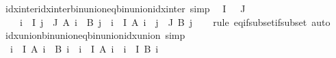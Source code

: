 \begin{isabellebody}
\endisatagproof
{\isafoldproof}%
%
\isadelimproof
\isanewline
%
\endisadelimproof
\isanewline
{}\isamarkupfalse%
\ idx{\isacharunderscore}{\kern0pt}inter{\isacharunderscore}{\kern0pt}idx{\isacharunderscore}{\kern0pt}inter{\isacharunderscore}{\kern0pt}bin{\isacharunderscore}{\kern0pt}union{\isacharunderscore}{\kern0pt}eq{\isacharunderscore}{\kern0pt}bin{\isacharunderscore}{\kern0pt}union{\isacharunderscore}{\kern0pt}idx{\isacharunderscore}{\kern0pt}inter\ {\isacharbrackleft}{\kern0pt}simp{\isacharbrackright}{\kern0pt}{\isacharcolon}{\kern0pt}\isanewline
\ \ {\isachardoublequoteopen}{\isasymlbrakk}I\ {\isasymnoteq}\ {\isacharbraceleft}{\kern0pt}{\isacharbraceright}{\kern0pt}{\isacharsemicolon}{\kern0pt}\ J\ {\isasymnoteq}\ {\isacharbraceleft}{\kern0pt}{\isacharbraceright}{\kern0pt}{\isasymrbrakk}\ {\isasymLongrightarrow}\isanewline
\ \ \ \ {\isacharparenleft}{\kern0pt}{\isasymInter}i\ {\isasymin}\ I{\isachardot}{\kern0pt}\ {\isasymInter}j\ {\isasymin}\ J{\isachardot}{\kern0pt}\ A\ i\ {\isasymunion}\ B\ j{\isacharparenright}{\kern0pt}\ {\isacharequal}{\kern0pt}\ {\isacharparenleft}{\kern0pt}{\isasymInter}i\ {\isasymin}\ I{\isachardot}{\kern0pt}\ A\ i{\isacharparenright}{\kern0pt}\ {\isasymunion}\ {\isacharparenleft}{\kern0pt}{\isasymInter}j\ {\isasymin}\ J{\isachardot}{\kern0pt}\ B\ j{\isacharparenright}{\kern0pt}{\isachardoublequoteclose}\isanewline
%
\isadelimproof
\ \ %
\endisadelimproof
%
\isatagproof
{}\isamarkupfalse%
\ {\isacharparenleft}{\kern0pt}rule\ eq{\isacharunderscore}{\kern0pt}if{\isacharunderscore}{\kern0pt}subset{\isacharunderscore}{\kern0pt}if{\isacharunderscore}{\kern0pt}subset{\isacharparenright}{\kern0pt}\ auto%
\endisatagproof
{\isafoldproof}%
%
\isadelimproof
\isanewline
%
\endisadelimproof
\isanewline
{}\isamarkupfalse%
\ idx{\isacharunderscore}{\kern0pt}union{\isacharunderscore}{\kern0pt}bin{\isacharunderscore}{\kern0pt}union{\isacharunderscore}{\kern0pt}eq{\isacharunderscore}{\kern0pt}bin{\isacharunderscore}{\kern0pt}union{\isacharunderscore}{\kern0pt}idx{\isacharunderscore}{\kern0pt}union\ {\isacharbrackleft}{\kern0pt}simp{\isacharbrackright}{\kern0pt}{\isacharcolon}{\kern0pt}\isanewline
\ \ {\isachardoublequoteopen}{\isacharparenleft}{\kern0pt}{\isasymUnion}i\ {\isasymin}\ I{\isachardot}{\kern0pt}\ A\ i\ {\isasymunion}\ B\ i{\isacharparenright}{\kern0pt}\ {\isacharequal}{\kern0pt}\ {\isacharparenleft}{\kern0pt}{\isasymUnion}i\ {\isasymin}\ I{\isachardot}{\kern0pt}\ A\ i{\isacharparenright}{\kern0pt}\ {\isasymunion}\ {\isacharparenleft}{\kern0pt}{\isasymUnion}i\ {\isasymin}\ I{\isachardot}{\kern0pt}\ B\ i{\isacharparenright}{\kern0pt}{\isachardoublequoteclose}\isanewline

\end{isabellebody}
